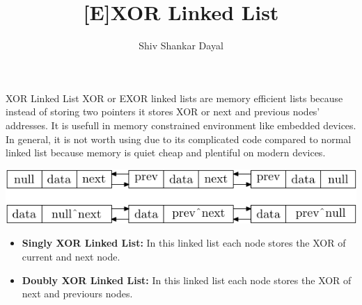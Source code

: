 \documentclass[aspectratio=169,8pt]{beamer}
\title{[E]XOR Linked List}
\author[Shiv Shankar Dayal]{Shiv Shankar Dayal}
\begin{document}
\begin{frame}
  \titlepage
\end{frame}
\begin{frame}{XOR Linked List}
  XOR or EXOR linked lists are memory efficient lists because instead of storing two
  pointers it stores XOR or next and previous nodes' addresses. It is usefull in
  memory constrained environment like embedded devices. In general, it is not worth using
  due to its complicated code compared to normal linked list because memory is quiet
  cheap and plentiful on modern devices.
  \begin{center}
    \includegraphics{exor_linked_list}
  \end{center}
  \begin{itemize}
  \item {\bf Singly XOR Linked List:} In this linked list each node stores the XOR of
  current and next node.
  \item{\bf Doubly XOR Linked List:} In this linked list each node stores the XOR of
  next and previours nodes.
  \end{itemize}
\end{frame}
\end{document}
